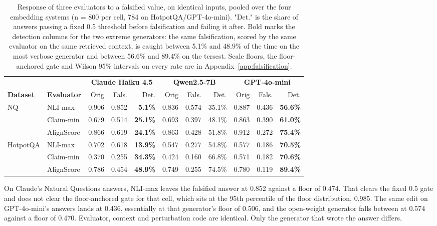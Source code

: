 \documentclass[11pt]{article}
\begin{document}
\begin{table}[t]
\centering
\small
\begin{tabular}{llrrrrrrrrr}
\toprule
 & & \multicolumn{3}{c}{\textbf{Claude Haiku 4.5}} & \multicolumn{3}{c}{\textbf{Qwen2.5-7B}} & \multicolumn{3}{c}{\textbf{GPT-4o-mini}} \\
\cmidrule(lr){3-5}\cmidrule(lr){6-8}\cmidrule(lr){9-11}
\textbf{Dataset} & \textbf{Evaluator} & Orig & Fals. & Det. & Orig & Fals. & Det. & Orig & Fals. & Det. \\ 
\midrule
NQ & NLI-max & 0.906 & 0.852 & \textbf{5.1\%} & 0.836 & 0.574 & 35.1\% & 0.887 & 0.436 & \textbf{56.6\%} \\ 
 & Claim-min & 0.679 & 0.514 & \textbf{25.1\%} & 0.693 & 0.397 & 48.1\% & 0.863 & 0.390 & \textbf{61.0\%} \\ 
 & AlignScore & 0.866 & 0.619 & \textbf{24.1\%} & 0.863 & 0.428 & 51.8\% & 0.912 & 0.272 & \textbf{75.4\%} \\ 
\midrule
HotpotQA & NLI-max & 0.702 & 0.618 & \textbf{13.9\%} & 0.547 & 0.277 & 54.8\% & 0.577 & 0.186 & \textbf{70.5\%} \\ 
 & Claim-min & 0.370 & 0.255 & \textbf{34.3\%} & 0.424 & 0.160 & 66.8\% & 0.571 & 0.182 & \textbf{70.6\%} \\ 
 & AlignScore & 0.786 & 0.454 & \textbf{48.9\%} & 0.749 & 0.255 & 74.5\% & 0.780 & 0.119 & \textbf{89.4\%} \\ 
\bottomrule
\end{tabular}
\caption{Response of three evaluators to a falsified value, on identical inputs, pooled over the four embedding systems (n = 800 per cell, 784 on HotpotQA/GPT-4o-mini). "Det." is the share of answers passing a fixed 0.5 threshold before falsification and failing it after. Bold marks the detection columns for the two extreme generators: the same falsification, scored by the same evaluator on the same retrieved context, is caught between 5.1\% and 48.9\% of the time on the most verbose generator and between 56.6\% and 89.4\% on the tersest. Scale floors, the floor-anchored gate and Wilson 95\% intervals on every rate are in Appendix~\ref{app:falsification}.}
\label{tab:2}
\end{table}

On Claude's Natural Questions answers, NLI-max leaves the falsified answer at 0.852 against a floor of 0.474. That clears the fixed 0.5 gate and does not clear the floor-anchored gate for that cell, which sits at the 95th percentile of the floor distribution, 0.985. The same edit on GPT-4o-mini's answers lands at 0.436, essentially at that generator's floor of 0.506, and the open-weight generator falls between at 0.574 against a floor of 0.470. Evaluator, context and perturbation code are identical. Only the generator that wrote the answer differs.
\end{document}
